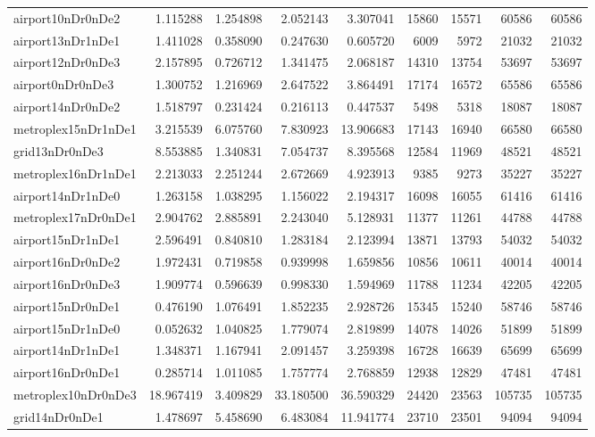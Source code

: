 \begin{longtable}{|l|r|r|r|r|r|r|r|r|}
airport10nDr0nDe2 & 1.115288 & 1.254898 & 2.052143 & 3.307041 & 15860 & 15571 & 60586 & 60586 \\
airport13nDr1nDe1 & 1.411028 & 0.358090 & 0.247630 & 0.605720 & 6009 & 5972 & 21032 & 21032 \\
airport12nDr0nDe3 & 2.157895 & 0.726712 & 1.341475 & 2.068187 & 14310 & 13754 & 53697 & 53697 \\
airport0nDr0nDe3 & 1.300752 & 1.216969 & 2.647522 & 3.864491 & 17174 & 16572 & 65586 & 65586 \\
airport14nDr0nDe2 & 1.518797 & 0.231424 & 0.216113 & 0.447537 & 5498 & 5318 & 18087 & 18087 \\
metroplex15nDr1nDe1 & 3.215539 & 6.075760 & 7.830923 & 13.906683 & 17143 & 16940 & 66580 & 66580 \\
grid13nDr0nDe3 & 8.553885 & 1.340831 & 7.054737 & 8.395568 & 12584 & 11969 & 48521 & 48521 \\
metroplex16nDr1nDe1 & 2.213033 & 2.251244 & 2.672669 & 4.923913 & 9385 & 9273 & 35227 & 35227 \\
airport14nDr1nDe0 & 1.263158 & 1.038295 & 1.156022 & 2.194317 & 16098 & 16055 & 61416 & 61416 \\
metroplex17nDr0nDe1 & 2.904762 & 2.885891 & 2.243040 & 5.128931 & 11377 & 11261 & 44788 & 44788 \\
airport15nDr1nDe1 & 2.596491 & 0.840810 & 1.283184 & 2.123994 & 13871 & 13793 & 54032 & 54032 \\
airport16nDr0nDe2 & 1.972431 & 0.719858 & 0.939998 & 1.659856 & 10856 & 10611 & 40014 & 40014 \\
airport16nDr0nDe3 & 1.909774 & 0.596639 & 0.998330 & 1.594969 & 11788 & 11234 & 42205 & 42205 \\
airport15nDr0nDe1 & 0.476190 & 1.076491 & 1.852235 & 2.928726 & 15345 & 15240 & 58746 & 58746 \\
airport15nDr1nDe0 & 0.052632 & 1.040825 & 1.779074 & 2.819899 & 14078 & 14026 & 51899 & 51899 \\
airport14nDr1nDe1 & 1.348371 & 1.167941 & 2.091457 & 3.259398 & 16728 & 16639 & 65699 & 65699 \\
airport16nDr0nDe1 & 0.285714 & 1.011085 & 1.757774 & 2.768859 & 12938 & 12829 & 47481 & 47481 \\
metroplex10nDr0nDe3 & 18.967419 & 3.409829 & 33.180500 & 36.590329 & 24420 & 23563 & 105735 & 105735 \\
grid14nDr0nDe1 & 1.478697 & 5.458690 & 6.483084 & 11.941774 & 23710 & 23501 & 94094 & 94094 \\

\end{longtable}
